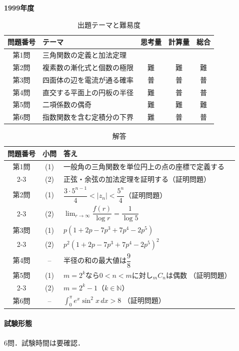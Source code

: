 \documentclass[../../main.tex]{subfiles}
\begin{document}
\begin{center}
  {\fontsize{48pt}{58pt}\selectfont \textbf{1999}\normalsize\textbf{年度}}
\end{center}

\begin{table}[htb]
  \centering
  \caption{出題テーマと難易度}
  \begin{tabular}{|c|p{6.2cm}|c|c|c|}
    \hline
    \textbf{問題番号} & \textbf{テーマ} & \textbf{思考量} & \textbf{計算量} & \textbf{総合} \\
    \hline
    第1問 & 三角関数の定義と加法定理 &  &  &  \\
    \hline
    第2問 & 複素数の漸化式と個数の極限 & 難 & 難 & 難 \\
    \hline
    第3問 & 四面体の辺を電流が通る確率 & 普 & 普 & 普 \\
    \hline
    第4問 & 直交する平面上の円板の半径 & 難 & 普 & 普 \\
    \hline
    第5問 & 二項係数の偶奇 & 難 & 難 & 難 \\
    \hline
    第6問 & 指数関数を含む定積分の下界 & 難 & 普 & 普 \\
    \hline
  \end{tabular}
\end{table}

\begin{table}[htb]
  \centering
  \caption{解答}
  \renewcommand{\arraystretch}{1.4}
  \begin{tabular}{|c|c|p{9cm}|}
    \hline
    \textbf{問題番号} & \textbf{小問} & \textbf{答え} \\
    \hline
    第1問 & (1) & 一般角の三角関数を単位円上の点の座標で定義する \\
    \cline{2-3}
    & (2) & 正弦・余弦の加法定理を証明する（証明問題） \\
    \hline
    第2問 & (1) & $\dfrac{3\cdot5^{n-1}}{4}<|z_n|<
    \dfrac{5^n}{4}$（証明問題） \\
    \cline{2-3}
    & (2) & $\displaystyle\lim_{r\to\infty}
    \dfrac{f(r)}{\log r}=\dfrac{1}{\log5}$ \\
    \hline
    第3問 & (1) & $p(1+2p-7p^3+7p^4-2p^5)$ \\
    \cline{2-3}
    & (2) & $p^2(1+2p-7p^3+7p^4-2p^5)^2$ \\
    \hline
    第4問 & -- & 半径の和の最大値は$\dfrac{9}{8}$ \\
    \hline
    第5問 & (1) & $m=2^k$なら$0<n<m$に対し${}_mC_n$は偶数
    （証明問題） \\
    \cline{2-3}
    & (2) & $m=2^k-1$（$k\in\mathbb{N}$） \\
    \hline
    第6問 & -- & $\displaystyle\int_0^\pi e^x\sin^2x\,dx>8$
    （証明問題） \\
    \hline
  \end{tabular}
\end{table}

\paragraph{試験形態}
6問．試験時間は要確認．
\end{document}
